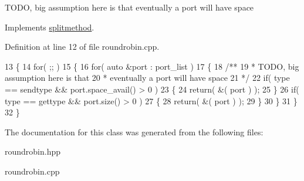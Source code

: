 T\+O\+DO, big assumption here is that eventually a port will have space

Implements \hyperlink{classsplitmethod}{splitmethod}.



Definition at line 12 of file roundrobin.\+cpp.


\begin{DoxyCode}
13 \{
14    \textcolor{keywordflow}{for}( ;; )
15    \{
16       \textcolor{keywordflow}{for}( \textcolor{keyword}{auto} &port : port\_list )
17       \{\textcolor{comment}{}
18 \textcolor{comment}{         /** }
19 \textcolor{comment}{          * TODO, big assumption here is that }
20 \textcolor{comment}{          * eventually a port will have space }
21 \textcolor{comment}{          */}
22          \textcolor{keywordflow}{if}( type == sendtype && port.space\_avail() > 0 )
23          \{
24             \textcolor{keywordflow}{return}( &( port ) );
25          \}
26          \textcolor{keywordflow}{if}( type == gettype && port.size() > 0 )
27          \{
28             \textcolor{keywordflow}{return}( &( port ) );
29          \}
30       \}
31    \}
32 \}
\end{DoxyCode}


The documentation for this class was generated from the following files\+:\begin{DoxyCompactItemize}
\item 
roundrobin.\+hpp\item 
roundrobin.\+cpp\end{DoxyCompactItemize}
